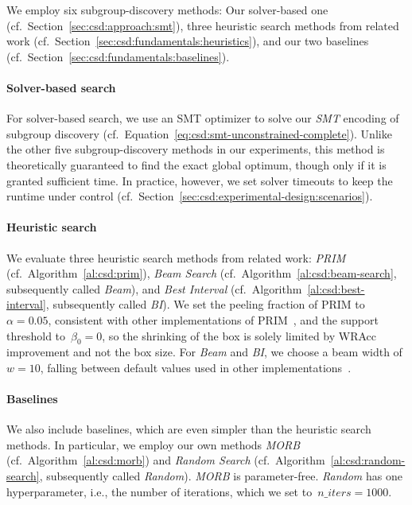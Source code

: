 \documentclass{article}
\theoremstyle{definition}
\begin{document}
We employ six subgroup-discovery methods:
Our solver-based one (cf.~Section~\ref{sec:csd:approach:smt}), three heuristic search methods from related work (cf.~Section~\ref{sec:csd:fundamentals:heuristics}), and our two baselines (cf.~Section~\ref{sec:csd:fundamentals:baselines}).

\paragraph{Solver-based search}

For solver-based search, we use an SMT optimizer to solve our \emph{SMT} encoding of subgroup discovery (cf.~Equation~\ref{eq:csd:smt-unconstrained-complete}).
Unlike the other five subgroup-discovery methods in our experiments, this method is theoretically guaranteed to find the exact global optimum, though only if it is granted sufficient time.
In practice, however, we set solver timeouts to keep the runtime under control (cf.~Section~\ref{sec:csd:experimental-design:scenarios}).

\paragraph{Heuristic search}

We evaluate three heuristic search methods from related work:
\emph{PRIM} (cf.~Algorithm~\ref{al:csd:prim}), \emph{Beam Search} (cf.~Algorithm~\ref{al:csd:beam-search}, subsequently called \emph{Beam}), and \emph{Best Interval} (cf.~Algorithm~\ref{al:csd:best-interval}, subsequently called \emph{BI}).
We set the peeling fraction of PRIM to~$\alpha = 0.05$, consistent with other implementations of PRIM~\cite{arzamasov2021reds, kwakkel2017the}, and the support threshold to~$\beta_0 = 0$, so the shrinking of the box is solely limited by WRAcc improvement and not the box size.
For \emph{Beam} and \emph{BI}, we choose a beam width of $w=10$, falling between default values used in other implementations~\cite{arzamasov2021reds, lemmerich2019pysubgroup}.

\paragraph{Baselines}

We also include baselines, which are even simpler than the heuristic search methods.
In particular, we employ our own methods \emph{MORB} (cf.~Algorithm~\ref{al:csd:morb}) and \emph{Random Search} (cf.~Algorithm~\ref{al:csd:random-search}, subsequently called \emph{Random}).
\emph{MORB} is parameter-free.
\emph{Random} has one hyperparameter, i.e., the number of iterations, which we set to~$n\_iters = 1000$.
\end{document}
